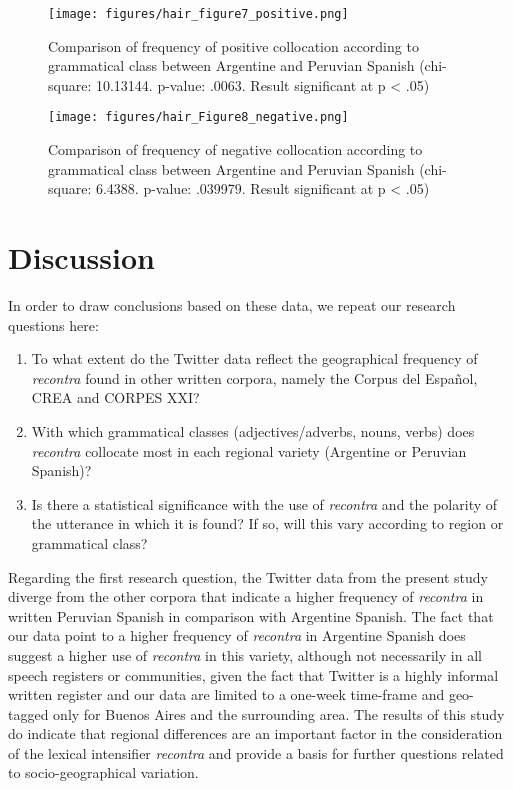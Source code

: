 \documentclass[output=paper,colorlinks,citecolor=brown,
]{langscibook}
\begin{document}
\begin{figure}
    
    \texttt{[image: figures/hair\_figure7\_positive.png]}
    \caption{Comparison of frequency of positive collocation according to grammatical class between Argentine and Peruvian Spanish (chi-square: 10.13144. p-value: .0063. Result significant at p < .05)}
    \label{fig:hair:7}
\end{figure}


\begin{figure}
    
    \texttt{[image: figures/hair\_Figure8\_negative.png]}
    \caption{Comparison of frequency of negative collocation according to grammatical class between Argentine and Peruvian Spanish (chi-square: 6.4388. p-value: .039979. Result significant at p < .05)}
    \label{fig:hair:8}
\end{figure}



\section{Discussion}

In order to draw conclusions based on these data, we repeat our research questions here:

\begin{enumerate}
    \item To what extent do the Twitter data reflect the geographical frequency of \textit{recontra} found in other written corpora, namely the Corpus del Español, CREA and CORPES XXI?  
    \item With which grammatical classes (adjectives/adverbs, nouns, verbs) does \textit{recontra} collocate most in each regional variety (Argentine or Peruvian Spanish)? 
    \item Is there a statistical significance with the use of \textit{recontra} and the polarity of the utterance in which it is found? If so, will this vary according to region or grammatical class?
\end{enumerate}


Regarding the first research question, the Twitter data from the present study diverge from the other corpora that indicate a higher frequency of \textit{recontra} in written Peruvian Spanish in comparison with Argentine Spanish. The fact that our data point to a higher frequency of \textit{recontra} in Argentine Spanish does suggest a higher use of \textit{recontra} in this variety, although not necessarily in all speech registers or communities, given the fact that Twitter is a highly informal written register and our data are limited to a one-week time-frame and geo-tagged only for Buenos Aires and the surrounding area. The results of this study do indicate that regional differences are an important factor in the consideration of the lexical intensifier \textit{recontra} and provide a basis for further questions related to socio-geographical variation. 
\end{document}
